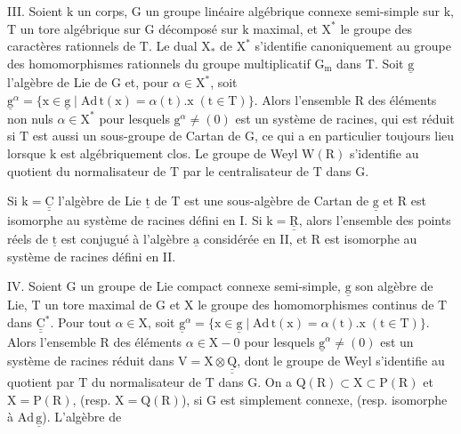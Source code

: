 III. Soient $\mathrm k$ un corps, $\mathrm G$ un groupe linéaire algébrique connexe semi-simple sur $\mathrm k$, $\mathrm T$ un tore algébrique sur $\mathrm G$ décomposé sur $\mathrm k$ maximal, et $\mathrm X^{*}$ le groupe des caractères rationnels de $\mathrm T$. Le dual $\mathrm X_{*}$ de $\mathrm X^{*}$ s'identifie canoniquement au groupe des homomorphismes rationnels du groupe multiplicatif $\mathrm G_{\mathrm m}$ dans $\mathrm T$. Soit $\underline{\mathrm g}$ l'algèbre de Lie de $\mathrm G$ et, pour $\alpha\in\mathrm X^{*}$, soit $\underline{\mathrm g}^{\alpha}=\{\mathrm x\in\underline{\mathrm g}\mid\mathrm{Ad}\,\mathrm t(\mathrm x)=\alpha(\mathrm t).\mathrm x\;(\mathrm t\in\mathrm T)\}$. Alors l'ensemble $\mathrm R$ des éléments non nuls $\alpha\in\mathrm X^{*}$ pour lesquels $\mathrm g^{\alpha}\ne(0)$ est un système de racines, qui est réduit si $\mathrm T$ est aussi un sous-groupe de Cartan de $\mathrm G$, ce qui a en particulier toujours lieu lorsque $\mathrm k$ est algébriquement clos. Le groupe de Weyl $\mathrm W(\mathrm R)$ s'identifie au quotient du normalisateur de $\mathrm T$ par le centralisateur de $\mathrm T$ dans $\mathrm G$.

Si $\mathrm k=\underline{\underline{\mathrm C}}$ l'algèbre de Lie $\underline{\mathrm t}$ de $\mathrm T$ est une sous-algèbre de Cartan de $\underline{\mathrm g}$ et $\mathrm R$ est isomorphe au système de racines défini en I. Si $\mathrm k=\underline{\underline{\mathrm R}}$, alors l'ensemble des points réels de $\underline{\mathrm t}$ est conjugué à l'algèbre $\underline{\mathrm a}$ considérée en II, et $\mathrm R$ est isomorphe au système de racines défini en II.

IV. Soient $\mathrm G$ un groupe de Lie compact connexe semi-simple, $\underline{\mathrm g}$ son algèbre de Lie, $\mathrm T$ un tore maximal de $\mathrm G$ et $\mathrm X$ le groupe des homomorphismes continus de $\mathrm T$ dans $\underline{\underline{\mathrm C}}^{*}$. Pour tout $\alpha\in\mathrm X$, soit $\underline{\mathrm g}^{\alpha}=\{\mathrm x\in\underline{\mathrm g}\mid\mathrm{Ad}\,\mathrm t(\mathrm x)=\alpha(\mathrm t).\mathrm x\;(\mathrm t\in\mathrm T)\}$. Alors l'ensemble $\mathrm R$ des éléments $\alpha\in\mathrm X-0$ pour lesquels $\underline{\mathrm g}^{\alpha}\ne(0)$ est un système de racines réduit dans $\mathrm V=\mathrm X\otimes\underline{\underline{\mathrm Q}}$, dont le groupe de Weyl s'identifie au quotient par $\mathrm T$ du normalisateur de $\mathrm T$ dans $\mathrm G$. On a $\mathrm Q(\mathrm R)\subset\mathrm X\subset\mathrm P(\mathrm R)$ et $\mathrm X=\mathrm P(\mathrm R)$, (resp. $\mathrm X=\mathrm Q(\mathrm R)$), si $\mathrm G$ est simplement connexe, (resp. isomorphe à $\mathrm{Ad}\,\underline{\mathrm g}$). L'algèbre de

